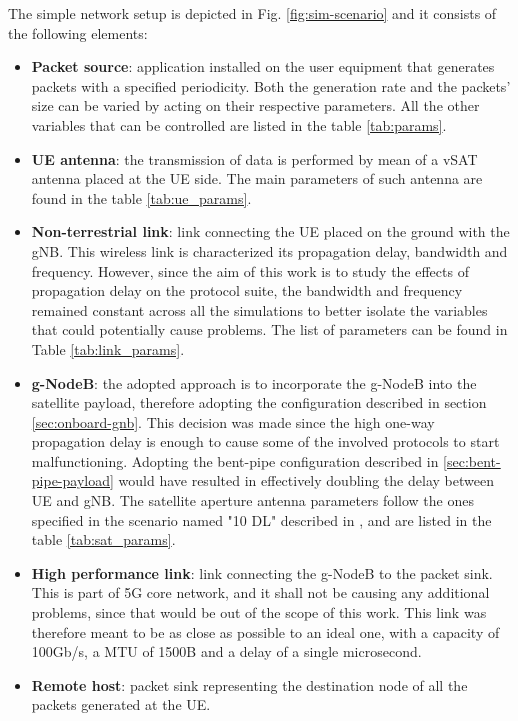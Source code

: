The simple network setup is depicted in Fig. \ref{fig:sim-scenario} and it consists of the following elements:
\begin{itemize}
    \item \textbf{Packet source}: application installed on the user equipment that generates packets with a specified periodicity. Both the generation rate and the packets' size can be varied by acting on their respective parameters. All the other variables that can be controlled are listed in the table \ref{tab:params}.
    \item \textbf{UE antenna}: the transmission of data is performed by mean of a \ac{vSAT} antenna placed at the \ac{UE} side. The main parameters of such antenna are found in the table \ref{tab:ue_params}.
    \item \textbf{Non-terrestrial link}: link connecting the \ac{UE} placed on the ground with the \ac{gNB}. This wireless link is characterized its propagation delay, bandwidth and frequency. However, since the aim of this work is to study the effects of propagation delay on the protocol suite, the bandwidth and frequency remained constant across all the simulations to better isolate the variables that could potentially cause problems. The list of parameters can be found in Table \ref{tab:link_params}.
    \item \textbf{g-NodeB}: the adopted approach is to incorporate the g-NodeB into the satellite payload, therefore adopting the configuration described in section \ref{sec:onboard-gnb}. This decision was made since the high one-way propagation delay is enough to cause some of the involved protocols to start malfunctioning. Adopting the bent-pipe configuration described in \ref{sec:bent-pipe-payload} would have resulted in effectively doubling the delay between \ac{UE} and \ac{gNB}. The satellite aperture antenna parameters follow the ones specified in the scenario named "10 DL" described in \cite{3gpp-tr-38.821}, and are listed in the table \ref{tab:sat_params}.
    \item \textbf{High performance link}: link connecting the g-NodeB to the packet sink. This is part of 5G core network, and it shall not be causing any additional problems, since that would be out of the scope of this work. This link was therefore meant to be as close as possible to an ideal one, with a capacity of 100Gb/s, a \ac{MTU} of 1500B and a delay of a single microsecond.
    \item \textbf{Remote host}: packet sink representing the destination node of all the packets generated at the \ac{UE}.
\end{itemize}

